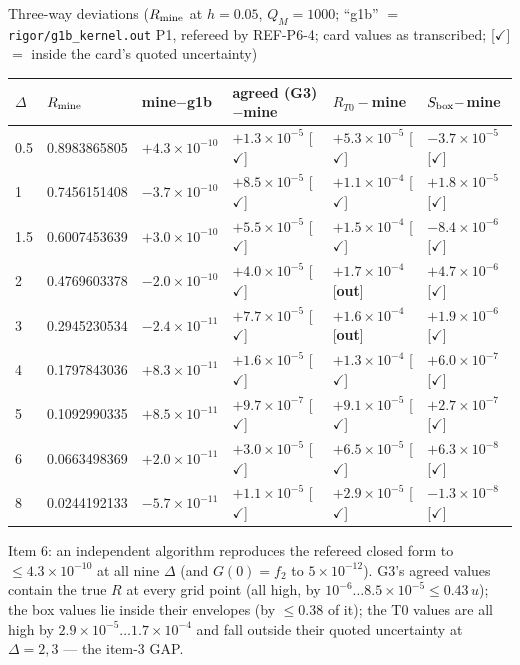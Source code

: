 \documentclass[11pt]{article}
\begin{document}
\begin{center}\small Three-way deviations ($R_{\rm mine}$ at $h=0.05$, $Q_M=1000$; ``g1b'' $=$ \texttt{rigor/g1b\_kernel.out}
P1, refereed by REF-P6-4; card values as transcribed; [$\checkmark$] $=$ inside the card's quoted uncertainty)\\[2pt]
\begin{tabular}{llllll}\toprule
$\Delta$ & $R_{\rm mine}$ & mine$-$g1b & agreed (G3)$-$mine & $R_{T0}-$mine & $S_{\rm box}-$mine\\\midrule
0.5 & 0.8983865805 & $+4.3\times10^{-10}$ & $+1.3\times10^{-5}$ [$\checkmark$] & $+5.3\times10^{-5}$ [$\checkmark$] & $-3.7\times10^{-5}$ [$\checkmark$]\\
1   & 0.7456151408 & $-3.7\times10^{-10}$ & $+8.5\times10^{-5}$ [$\checkmark$] & $+1.1\times10^{-4}$ [$\checkmark$] & $+1.8\times10^{-5}$ [$\checkmark$]\\
1.5 & 0.6007453639 & $+3.0\times10^{-10}$ & $+5.5\times10^{-5}$ [$\checkmark$] & $+1.5\times10^{-4}$ [$\checkmark$] & $-8.4\times10^{-6}$ [$\checkmark$]\\
2   & 0.4769603378 & $-2.0\times10^{-10}$ & $+4.0\times10^{-5}$ [$\checkmark$] & $+1.7\times10^{-4}$ [\textbf{out}] & $+4.7\times10^{-6}$ [$\checkmark$]\\
3   & 0.2945230534 & $-2.4\times10^{-11}$ & $+7.7\times10^{-5}$ [$\checkmark$] & $+1.6\times10^{-4}$ [\textbf{out}] & $+1.9\times10^{-6}$ [$\checkmark$]\\
4   & 0.1797843036 & $+8.3\times10^{-11}$ & $+1.6\times10^{-5}$ [$\checkmark$] & $+1.3\times10^{-4}$ [$\checkmark$] & $+6.0\times10^{-7}$ [$\checkmark$]\\
5   & 0.1092990335 & $+8.5\times10^{-11}$ & $+9.7\times10^{-7}$ [$\checkmark$] & $+9.1\times10^{-5}$ [$\checkmark$] & $+2.7\times10^{-7}$ [$\checkmark$]\\
6   & 0.0663498369 & $+2.0\times10^{-11}$ & $+3.0\times10^{-5}$ [$\checkmark$] & $+6.5\times10^{-5}$ [$\checkmark$] & $+6.3\times10^{-8}$ [$\checkmark$]\\
8   & 0.0244192133 & $-5.7\times10^{-11}$ & $+1.1\times10^{-5}$ [$\checkmark$] & $+2.9\times10^{-5}$ [$\checkmark$] & $-1.3\times10^{-8}$ [$\checkmark$]\\\bottomrule
\end{tabular}\end{center}
\begin{verdictok}
Item 6: an independent algorithm reproduces the refereed closed form to $\le4.3\times10^{-10}$ at all nine $\Delta$ (and
$G(0)=f_2$ to $5\times10^{-12}$). G3's agreed values contain the true $R$ at every grid point (all high, by
$10^{-6}\ldots8.5\times10^{-5}\le0.43\,u$); the box values lie inside their envelopes (by $\le0.38$ of it); the T0 values are
all high by $2.9\times10^{-5}\ldots1.7\times10^{-4}$ and fall outside their quoted uncertainty at $\Delta=2,3$ --- the item-3 GAP.
\end{verdictok}
\end{document}
